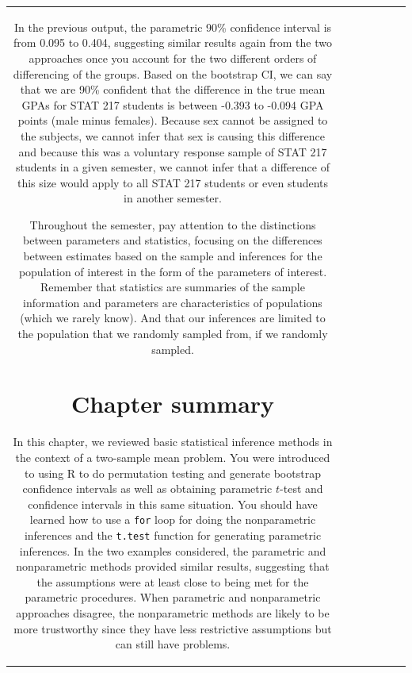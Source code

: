 \documentclass[]{book}
\newenvironment{Shaded}{\begin{snugshade}}{\end{snugshade}}
\theoremstyle{definition}
\theoremstyle{definition}
\theoremstyle{remark}
\begin{document}
\begin{longtable}[]{@{}ccccccc@{}}
\begin{minipage}[b]{0.10\columnwidth}
\begin{Shaded}
\begin{Highlighting}[]
\begin{Shaded}
\begin{Highlighting}[]
\begin{Shaded}
\begin{Highlighting}[]
\begin{Shaded}
\begin{Highlighting}[]
\begin{Shaded}
\begin{Highlighting}[]
\begin{Shaded}
\begin{Highlighting}[]
\begin{Shaded}
\begin{Highlighting}[]
In the previous output, the parametric 90\% confidence interval is from
0.095 to 0.404, suggesting similar results again from the two approaches
once you account for the two different orders of differencing of the
groups. Based on the bootstrap CI, we can say that we are 90\% confident
that the difference in the true mean GPAs for STAT 217 students is
between -0.393 to -0.094 GPA points (male minus females). Because sex
cannot be assigned to the subjects, we cannot infer that sex is causing
this difference and because this was a voluntary response sample of STAT
217 students in a given semester, we cannot infer that a difference of
this size would apply to all STAT 217 students or even students in
another semester.

Throughout the semester, pay attention to the distinctions between
parameters and statistics, focusing on the differences between estimates
based on the sample and inferences for the population of interest in the
form of the parameters of interest. Remember that statistics are
summaries of the sample information and parameters are characteristics
of populations (which we rarely know). And that our inferences are
limited to the population that we randomly sampled from, if we randomly
sampled.

\section{Chapter summary}\label{section2-10}

In this chapter, we reviewed basic statistical inference methods in the
context of a two-sample mean problem. You were introduced to using R to
do permutation testing and generate bootstrap confidence intervals as
well as obtaining parametric \(t\)-test and confidence intervals in this
same situation. You should have learned how to use a \texttt{for} loop
for doing the nonparametric inferences and the \texttt{t.test} function
for generating parametric inferences. In the two examples considered,
the parametric and nonparametric methods provided similar results,
suggesting that the assumptions were at least close to being met for the
parametric procedures. When parametric and nonparametric approaches
disagree, the nonparametric methods are likely to be more trustworthy
since they have less restrictive assumptions but can still have
problems.


\end{Highlighting}
\end{Shaded}
\end{Highlighting}
\end{Shaded}
\end{Highlighting}
\end{Shaded}
\end{Highlighting}
\end{Shaded}
\end{Highlighting}
\end{Shaded}
\end{Highlighting}
\end{Shaded}
\end{Highlighting}
\end{Shaded}
\end{minipage}
\end{longtable}
\end{document}
